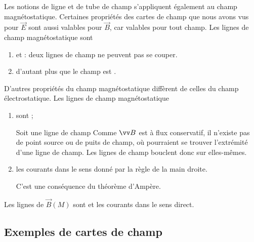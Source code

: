 \documentclass[12pt,fancy]{cours}
\begin{document}
Les notions de ligne et de tube de champ s’appliquent également au champ magnétostatique. Certaines propriétés des cartes de champ que nous avons vus pour $\Vec{E}$ sont aussi valables pour $\Vec{B}$, car valables pour tout champ. Les lignes de champ magnétostatique sont
\begin{enumerate}
\item  {} et  : deux lignes de champ ne peuvent pas se couper.
\item d’autant plus  que le champ est .
\end{enumerate}
D’autres propriétés du champ magnétostatique diffèrent de celles du champ électrostatique. Les lignes de champ magnétostatique
\begin{enumerate}
\item sont ;

\begin{preuve}
  Soit une ligne de champ 
  Comme $\B$ est à flux conservatif, il n'existe pas de point source ou de puits de champ, où pourraient se trouver l’extrémité d’une ligne de champ. Les lignes de champ bouclent donc sur elles-mêmes.
\end{preuve}
\item {} les courants dans le sens donné par la règle de la main droite.

\begin{preuve}
  C’est une conséquence du théorème d’Ampère.
\end{preuve}
\end{enumerate}
\begin{prop}\label{prop:}
  Les lignes de $\Vec{B}(M)$ sont  et  les courants dans le sens direct.
\end{prop}

\subsection{Exemples de cartes de champ}
\end{document}
